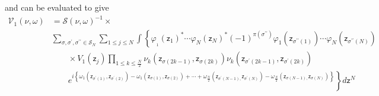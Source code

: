 \documentclass[aps,preprint]{revtex4}%
\begin{document}
and can be evaluated to give
\begin{align}
\mathcal{V}_{1}\left(  \nu,\omega\right)   &  =\mathcal{S}\left(  \nu
,\omega\right)  ^{-1}\times\nonumber\\
&
{\displaystyle\sum\limits_{\sigma,\sigma^{\prime},\sigma^{\prime\prime}%
\in\mathcal{S}_{N}}}
{\displaystyle\sum\limits_{1\leq j\leq N}}
\int\left\{  \varphi_{_{1}}\left(  \mathsf{z}_{1}\right)  ^{\ast}\cdots
\varphi_{N}\left(  \mathsf{z}_{N}\right)  ^{\ast}\left(  -1\right)
^{\pi\left(  \sigma^{\prime\prime}\right)  }\varphi_{1}\left(  \mathsf{z}%
_{\sigma^{\prime\prime}\left(  1\right)  }\right)  \cdots\varphi_{N}\left(
\mathsf{z}_{\sigma^{\prime\prime}\left(  N\right)  }\right)  \right.
\nonumber\\
&  \qquad\times V_{1}\left(  \mathsf{z}_{j}\right)
{\displaystyle\prod\limits_{1\leq k\leq\frac{N}{2}}}
\nu_{k}\left(  \mathsf{z}_{\sigma\left(  2k-1\right)  },\mathsf{z}%
_{\sigma\left(  2k\right)  }\right)  \nu_{k}\left(  \mathsf{z}_{\sigma
^{\prime}\left(  2k-1\right)  },\mathsf{z}_{\sigma^{\prime}\left(  2k\right)
}\right) \nonumber\\
&  \qquad\left.  e^{i\left\{  \omega_{1}\left(  \mathsf{z}_{\sigma^{\prime
}\left(  1\right)  },\mathsf{z}_{\sigma^{\prime}\left(  2\right)  }\right)
-\omega_{1}\left(  \mathsf{z}_{\sigma\left(  1\right)  },\mathsf{z}%
_{\sigma\left(  2\right)  }\right)  +\cdots+\omega_{\frac{N}{2}}\left(
\mathsf{z}_{\sigma^{\prime}\left(  N-1\right)  ,}\mathsf{z}_{\sigma^{\prime
}\left(  N\right)  }\right)  -\omega_{\frac{N}{2}}\left(  \mathsf{z}%
_{\sigma\left(  N-1\right)  ,}\mathsf{z}_{\sigma\left(  N\right)  }\right)
\right\}  }\right\}  d\mathsf{z}^{N}%
\end{align}
\end{document}
